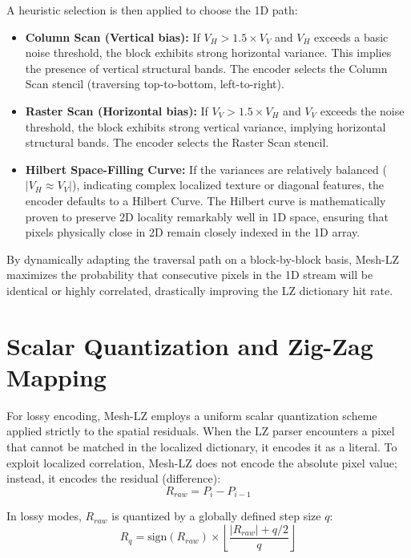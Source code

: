 A heuristic selection is then applied to choose the 1D path:
\begin{itemize}
    \item \textbf{Column Scan (Vertical bias):} If $V_H > 1.5 \times V_V$ and $V_H$ exceeds a basic noise threshold, the block exhibits strong horizontal variance. This implies the presence of vertical structural bands. The encoder selects the Column Scan stencil (traversing top-to-bottom, left-to-right).
    \item \textbf{Raster Scan (Horizontal bias):} If $V_V > 1.5 \times V_H$ and $V_V$ exceeds the noise threshold, the block exhibits strong vertical variance, implying horizontal structural bands. The encoder selects the Raster Scan stencil.
    \item \textbf{Hilbert Space-Filling Curve:} If the variances are relatively balanced ($|V_H \approx V_V|$), indicating complex localized texture or diagonal features, the encoder defaults to a Hilbert Curve. The Hilbert curve is mathematically proven to preserve 2D locality remarkably well in 1D space, ensuring that pixels physically close in 2D remain closely indexed in the 1D array.
\end{itemize}

By dynamically adapting the traversal path on a block-by-block basis, Mesh-LZ maximizes the probability that consecutive pixels in the 1D stream will be identical or highly correlated, drastically improving the LZ dictionary hit rate.

\section{Scalar Quantization and Zig-Zag Mapping}

For lossy encoding, Mesh-LZ employs a uniform scalar quantization scheme applied strictly to the spatial residuals. When the LZ parser encounters a pixel that cannot be matched in the localized dictionary, it encodes it as a literal. To exploit localized correlation, Mesh-LZ does not encode the absolute pixel value; instead, it encodes the residual (difference):
\begin{equation}
    R_{raw} = P_i - P_{i-1}
\end{equation}

In lossy modes, $R_{raw}$ is quantized by a globally defined step size $q$:
\begin{equation}
    R_{q} = \text{sign}(R_{raw}) \times \left\lfloor \frac{|R_{raw}| + q / 2}{q} \right\rfloor
\end{equation}

